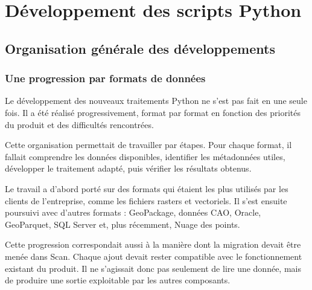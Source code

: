 
\chapter{Développement des scripts Python}
\label{chap:developpement_validation}


\section{Organisation générale des développements}
\label{sec:organisation_developpements}


\subsection{Une progression par formats de données}
\label{subsec:progression_sources}

Le développement des nouveaux traitements Python ne s'est pas fait en une seule
fois. Il a été réalisé progressivement, format par format en fonction des
priorités du produit et des difficultés rencontrées.

Cette organisation permettait de travailler par étapes. Pour chaque format, il
fallait comprendre les données disponibles, identifier les métadonnées utiles,
développer le traitement adapté, puis vérifier les résultats obtenus.

Le travail a d'abord porté sur des formats qui étaient les plus utilisés par les clients de l'entreprise, comme les
fichiers rasters et vectoriels. Il s'est ensuite poursuivi avec d'autres formats : GeoPackage, données CAO, Oracle, GeoParquet,
SQL Server et, plus récemment, Nuage des points.

Cette progression correspondait aussi à la manière dont la migration devait être
menée dans Scan. Chaque ajout devait rester compatible avec le fonctionnement
existant du produit. Il ne s'agissait donc pas seulement de lire une donnée, mais
de produire une sortie exploitable par les autres composants.

